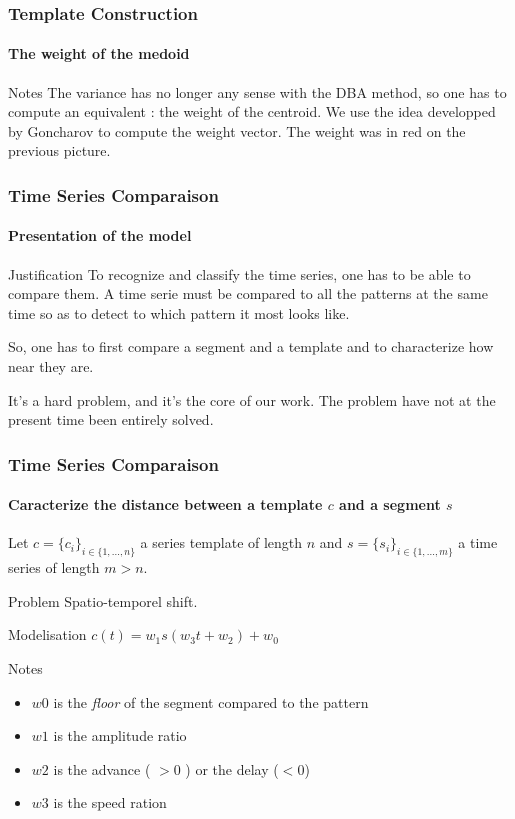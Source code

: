\documentclass[11pt, sans, handout]{beamer}
\begin{document}
\begin{frame}
	\frametitle{Template Construction}
	\framesubtitle{The weight of the medoid}
	
	\begin{exampleblock}{Notes}
	The variance has no longer any sense with the DBA method, so one has to compute an equivalent : the weight of the centroid. We use the idea developped by Goncharov\cite{goncharov} to compute the weight vector. The weight was in red on the previous picture.
	\end{exampleblock}
	
\end{frame}


\begin{frame}
	\frametitle{Time Series Comparaison}
	\framesubtitle{Presentation of the model}
	
	\begin{alertblock}{Justification}
	To recognize and classify the time series, one has to be able to compare them. A time serie must be compared to all the patterns at the same time so as to detect to which pattern it most looks like.
	\end{alertblock}
	
	So, one has to first compare a segment and a template and to characterize how near they are.
	
	\begin{exampleblock}
	It's a hard problem, and it's the core of our work. The problem have not at the present time been entirely solved.
	\end{exampleblock}
	
\end{frame}

\begin{frame}
	\frametitle{Time Series Comparaison}
	\framesubtitle{Caracterize the distance between a template $c$ and a segment $s$}

	Let $c=\{c_i\}_{ i \in \{1, ..., n\} }$ a series template of length $n$ and $s=\{s_i\}_{ i \in \{1, ..., m\} }$ a time series of length $m>n$.

	
	\begin{alertblock}{Problem}
	Spatio-temporel shift.
	\end{alertblock}
	
	\begin{block}{Modelisation}
	$c(t) = w_1 s(w_3 t + w_2) + w_0$
	\end{block}	
	
	\begin{exampleblock}{Notes}
	\begin{itemize}
	 \item $w0$ is the \textit{floor} of the segment compared to the pattern
	 \item $w1$ is the amplitude ratio
	 \item $w2$ is the advance ( $ >0$ ) or the delay ($<0$)
	 \item $w3$ is the speed ration
	\end{itemize}
	\end{exampleblock}
	
\end{frame}
\end{document}
